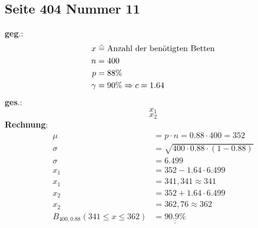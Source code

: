 \documentclass[a4paper,12pt]{article}
\newcommand\equalhat{\mathrel{\stackon[1.5pt]{=}{\stretchto{%
    \scalerel*[\widthof{=}]{\wedge}{\rule{1ex}{3ex}}}{0.5ex}}}}
\begin{document}
\subsection*{Seite 404 Nummer 11}
\textbf{geg}.:
\begin{equation*}
\begin{split}
x & \equalhat \text{Anzahl der benötigten Betten}\\
n & = 400\\
p & = 88\%\\
\gamma & = 90\% \Rightarrow c = 1.64
\end{split}
\end{equation*}
\textbf{ges}.:\\
$$x_{1}$$
$$x_{2}$$
\textbf{Rechnung}:\\
\begin{equation*}
\begin{split}
\mu & = p \cdot n = 0.88 \cdot 400 = 352\\
\sigma & = \sqrt{400 \cdot 0.88 \cdot (1 - 0.88)}\\
\sigma & = 6.499\\
x_{1} & = 352 - 1.64 \cdot 6.499\\
x_{1} & = 341,341 \approx 341\\
x_{2} & = 352 + 1.64 \cdot 6.499\\
x_{2} & = 362,76 \approx 362\\
B_{400, 0.88}(341 \leq x \leq 362) & = \underline{\underline{90.9\%}}
\end{split}
\end{equation*}
\pagebreak
\end{document}
